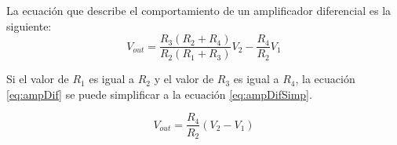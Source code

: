 La ecuación que describe el comportamiento de un amplificador diferencial es la siguiente:
\begin{equation}
    V_{out} =  \frac{R_3(R_2+R_4)}{R_2(R_1+R_3)}V_2 - \frac{R_4}{R_2}V_1
    \label{eq:ampDif}
\end{equation}

Si el valor de $R_1$ es igual a $R_2$ y el valor de $R_3$ es igual a $R_4$, la ecuación
\ref{eq:ampDif} se puede simplificar a la ecuación \ref{eq:ampDifSimp}.

\begin{equation}
    V_{out} =  \frac{R_4}{R_2}(V_2 - V_1)
    \label{eq:ampDifSimp}
\end{equation}